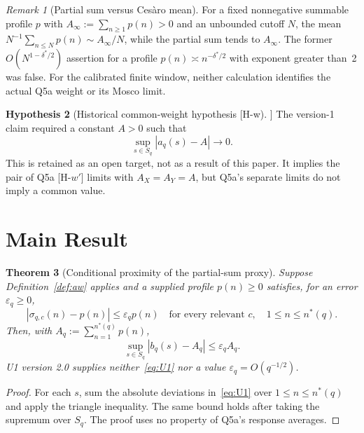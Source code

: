 \documentclass[12pt]{article}
\newtheorem{theorem}{Theorem}
\theoremstyle{definition}
\newtheorem{hypothesis}[theorem]{Hypothesis}
\theoremstyle{remark}
\newtheorem{remark}[theorem]{Remark}
\begin{document}
  \begin{remark}[Partial sum versus Ces\`aro mean]
    \label{rem:partial-sum}
    For a fixed nonnegative summable profile $p$ with
    $A_\infty:=\sum_{n\ge1}p(n)>0$ and an unbounded cutoff $N$, the mean
    $N^{-1}\sum_{n\le N}p(n)\sim A_\infty/N$, while the partial sum tends
    to $A_\infty$.
    The former $O(N^{1-\delta^*/2})$ assertion for a profile
    $p(n)\asymp n^{-\delta^*/2}$ with exponent greater than~2 was false.
    For the calibrated finite window, neither calculation identifies the
    actual Q5a weight or its Mosco limit.
  \end{remark}

  \begin{hypothesis}[Historical common-weight hypothesis [H-w]]
    \label{hyp:Hw}
    The version-1 claim required a constant $A>0$ such that
    \begin{equation}
      \label{eq:Hw}
      \sup_{s\in S_q}|a_q(s)-A|\longrightarrow0.
    \end{equation}
    This is retained as an open target, not as a result of this paper.
    It implies the pair of Q5a [H-$w'$] limits with $A_X=A_Y=A$,
    but Q5a's separate limits do not imply a common value.
  \end{hypothesis}

  \section{Main Result}

  \begin{theorem}[Conditional proximity of the partial-sum proxy]
    \label{thm:proximity}
    Suppose Definition~\ref{def:aw} applies and a supplied profile
    $p(n)\ge0$ satisfies, for an error $\varepsilon_q\ge0$,
    \begin{equation}
      \label{eq:U1}
      |\sigma_{q,c}(n)-p(n)|\le\varepsilon_q p(n)
      \quad\text{for every relevant }c,\quad 1\le n\le n^*(q).
    \end{equation}
    Then, with $A_q:=\sum_{n=1}^{n^*(q)}p(n)$,
    \begin{equation}
      \label{eq:proximity}
      \sup_{s\in S_q}|b_q(s)-A_q|\le\varepsilon_q A_q.
    \end{equation}
    U1 version 2.0 supplies neither~\eqref{eq:U1} nor a value
    $\varepsilon_q=O(q^{-1/2})$.
  \end{theorem}

  \begin{proof}
    For each $s$, sum the absolute deviations in~\eqref{eq:U1} over
    $1\le n\le n^*(q)$ and apply the triangle inequality.
    The same bound holds after taking the supremum over $S_q$.
    The proof uses no property of Q5a's response averages.
  \end{proof}
\end{document}
